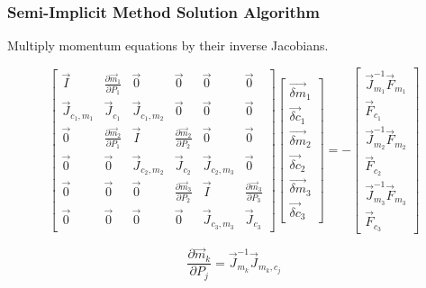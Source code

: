 \documentclass[compress,xcolor=table]{beamer}
\begin{document}
\begin{frame}
\frametitle{Semi-Implicit Method Solution Algorithm}

Multiply momentum equations by their inverse Jacobians.

\begin{equation*}
\begin{bmatrix} 
\vec{I} & \frac{\partial \vec{m}_1}{\partial P_1} & \vec{0} & \vec{0} & \vec{0} & \vec{0}\\
\vec{J}_{c_1,m_1} & \vec{J}_{c_1} & \vec{J}_{c_1,m_2} & \vec{0} & \vec{0} & \vec{0} \\
\vec{0} & \frac{\partial \vec{m}_2}{\partial P_1} & \vec{I} & \frac{\partial \vec{m}_2}{\partial P_2} & \vec{0} & \vec{0} \\
\vec{0} & \vec{0} & \vec{J}_{c_2,m_2} & \vec{J}_{c_2} & \vec{J}_{c_2,m_3} & \vec{0} \\
\vec{0} & \vec{0} & \vec{0} & \frac{\partial \vec{m}_{3}}{\partial P_2} & \vec{I} & \frac{\partial \vec{m}_{3}}{\partial P_3} \\ 
\vec{0} & \vec{0} & \vec{0} & \vec{0} & \vec{J}_{c_3,m_3} & \vec{J}_{c_3}  
\end{bmatrix} \begin{bmatrix}
\vec{\delta m}_{1} \\ \vec{\delta c}_{1} \\
\vec{\delta m}_{2} \\ \vec{\delta c}_{2} \\
\vec{\delta m}_{3} \\ \vec{\delta c}_{3}
\end{bmatrix}  = -\begin{bmatrix}
\vec{J}^{-1}_{m_1}\vec{F}_{m_1} \\ \vec{F}_{c_1} \\
\vec{J}^{-1}_{m_2}\vec{F}_{m_2} \\ \vec{F}_{c_2} \\
\vec{J}^{-1}_{m_3}\vec{F}_{m_3} \\ \vec{F}_{c_3} \end{bmatrix}
\end{equation*}

\begin{equation*}
\frac{\partial \vec{m}_k}{\partial P_j} = \vec{J}^{-1}_{m_k}\vec{J}_{m_k,c_j}
\end{equation*}

\end{frame}
\end{document}
